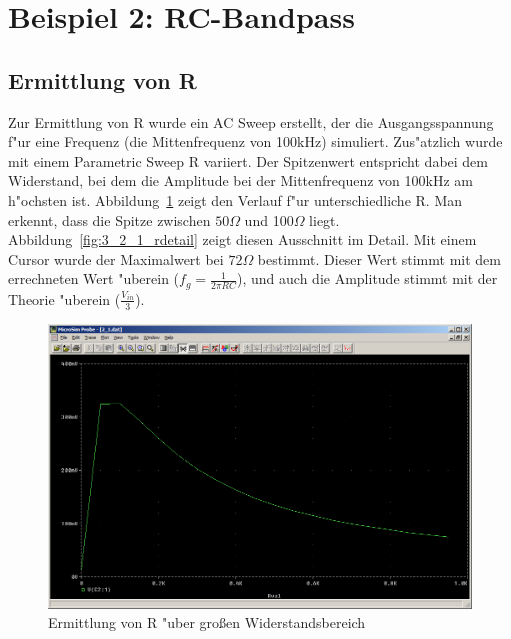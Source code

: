 \section{Beispiel 2: RC-Bandpass}

\subsection{Ermittlung von R}

Zur Ermittlung von R wurde ein AC Sweep erstellt, der die Ausgangsspannung f"ur eine Frequenz (die Mittenfrequenz von 100kHz) simuliert. Zus"atzlich wurde mit einem Parametric Sweep R variiert. Der Spitzenwert entspricht dabei dem Widerstand, bei dem die Amplitude bei der Mittenfrequenz von 100kHz am h"ochsten ist. Abbildung~\ref{fig:3_2_1_rgrob} zeigt den Verlauf f"ur unterschiedliche R. Man erkennt, dass die Spitze zwischen $50\Omega$ und 100$\Omega$ liegt. Abbildung~\ref{fig:3_2_1_rdetail} zeigt diesen Ausschnitt im Detail. Mit einem Cursor wurde der Maximalwert bei $72\Omega$ bestimmt. Dieser Wert stimmt mit dem errechneten Wert "uberein ($f_g = \frac{1}{2 \pi R C}$), und auch die Amplitude stimmt mit der Theorie "uberein ($\frac{V_{in}}{3}$).

\begin{figure}%
	\centering
	\includegraphics[width=\textwidth]{fig/bsp2/3_2_1_rgrob.PNG}
	\caption{Ermittlung von R "uber gro\ss{}en Widerstandsbereich}
	\label{fig:3_2_1_rgrob}
\end{figure}

